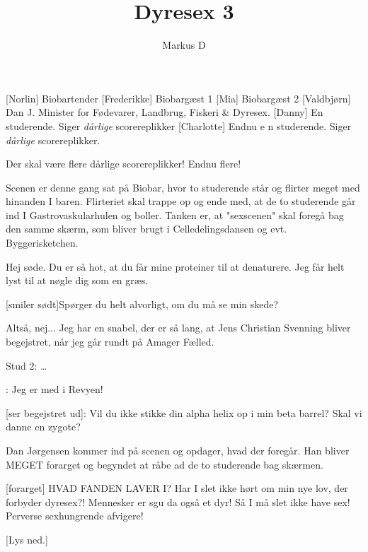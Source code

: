 \documentclass[a4paper,11pt]{article}
\title{Dyresex 3}
\author{Markus D}
\begin{document}
\maketitle

\begin{roles}
    [Norlin] Biobartender
    [Frederikke] Biobargæst 1
    [Mia] Biobargæst 2
    [Valdbjørn] Dan J. Minister for Fødevarer, Landbrug, Fiskeri \& Dyresex.
    [Danny] En studerende. Siger \textsl{dårlige} scorereplikker
    [Charlotte] Endnu e n studerende. Siger \textsl{dårlige} scorereplikker.
\end{roles}



\begin{sketch}

Der skal være flere dårlige scorereplikker! Endnu flere!

\scene Scenen er denne gang sat på Biobar, hvor to studerende står og flirter meget med hinanden I baren. Flirteriet skal trappe op og ende med, at de to studerende går ind I Gastrovaskularhulen og boller. Tanken er, at "sexscenen" skal foregå bag den samme skærm, som bliver brugt i Celledelingsdansen og evt. Byggerisketchen.

 Hej søde. Du er så hot, at du får mine proteiner til at denaturere. Jeg får helt lyst til at nøgle dig som en græs.

[smiler sødt]Spørger du helt alvorligt, om du må se min skede?

 Altså, nej...  
 Jeg har en snabel, der er så lang, at Jens Christian Svenning bliver begejstret, når jeg går rundt på Amager Fælled. 

Stud 2: \ldots

: Jeg er med i Revyen!

[ser begejstret ud]: Vil du ikke stikke din alpha helix op i min beta barrel? Skal vi danne en zygote? 

\scene Dan Jørgensen kommer ind på scenen og opdager, hvad der foregår. Han bliver MEGET forarget og begyndet at råbe ad de to studerende bag skærmen.

[forarget] HVAD FANDEN LAVER I?  Har I slet ikke hørt om min nye lov, der forbyder dyresex?! Mennesker er sgu da også et dyr! Så I må slet ikke have sex! Perverse sexhungrende afvigere!

[Lys ned.]


\end{sketch}
\end{document}
